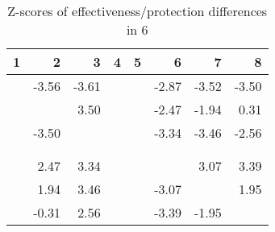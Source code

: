 \begin{table}[ht]
\centering
\begin{tabular}{rrrrrrrr}
  \hline
1 & 2 & 3 & 4 & 5 & 6 & 7 & 8 \\ 
  \hline
 & -3.56 & -3.61 &  &  & -2.87 & -3.52 & -3.50 \\ 
   &  & 3.50 &  &  & -2.47 & -1.94 & 0.31 \\ 
   & -3.50 &  &  &  & -3.34 & -3.46 & -2.56 \\ 
   &  &  &  &  &  &  &  \\ 
   &  &  &  &  &  &  &  \\ 
   & 2.47 & 3.34 &  &  &  & 3.07 & 3.39 \\ 
   & 1.94 & 3.46 &  &  & -3.07 &  & 1.95 \\ 
   & -0.31 & 2.56 &  &  & -3.39 & -1.95 &  \\ 
   \hline
\end{tabular}
\caption{Z-scores of effectiveness/protection differences in  6} 
\end{table}
